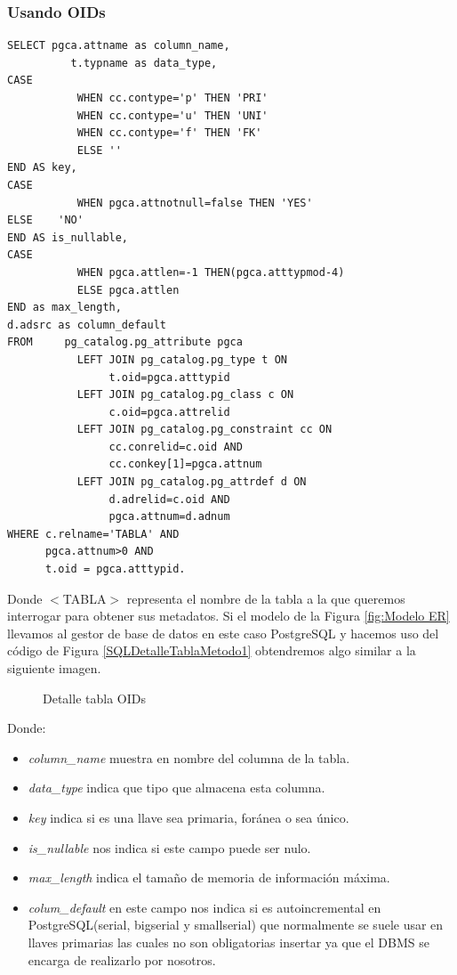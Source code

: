 \subsubsection{Usando OIDs}
\lstset{language=sql,breaklines=true}
\label{SQLDetalleTablaMetodo1}
\begin{lstlisting}
SELECT pgca.attname as column_name,
	      t.typname as data_type,
CASE
		   WHEN cc.contype='p' THEN 'PRI'
		   WHEN cc.contype='u' THEN 'UNI'
		   WHEN cc.contype='f' THEN 'FK'
		   ELSE '' 
END AS key,	
CASE 
		   WHEN pgca.attnotnull=false THEN 'YES' 
ELSE    'NO' 
END AS is_nullable,
CASE 
		   WHEN pgca.attlen=-1 THEN(pgca.atttypmod-4) 
		   ELSE pgca.attlen 
END as max_length,
d.adsrc as column_default
FROM	 pg_catalog.pg_attribute pgca
		   LEFT JOIN pg_catalog.pg_type t ON
			    t.oid=pgca.atttypid
		   LEFT JOIN pg_catalog.pg_class c ON
			    c.oid=pgca.attrelid
		   LEFT JOIN pg_catalog.pg_constraint cc ON 
			    cc.conrelid=c.oid AND 
			    cc.conkey[1]=pgca.attnum
		   LEFT JOIN pg_catalog.pg_attrdef d ON
			    d.adrelid=c.oid AND 
			    pgca.attnum=d.adnum
WHERE c.relname='TABLA' AND
	  pgca.attnum>0 AND
	  t.oid = pgca.atttypid.
\end{lstlisting}
Donde $<$TABLA$>$ representa el nombre de la tabla a la que queremos interrogar para obtener sus metadatos.
Si el modelo de la Figura \ref{fig:Modelo ER} llevamos al gestor de base de datos en este caso PostgreSQL y hacemos uso del c\'odigo de Figura \ref{SQLDetalleTablaMetodo1}  obtendremos algo similar a la siguiente imagen. 
\begin{figure}[H]
\centering
{}
\caption{Detalle tabla OIDs} \label{fig:Detalle Metodo 1}
\end{figure}
Donde:
\begin{itemize}
\item \emph{column\_name} muestra en nombre del columna de la tabla.
\item \emph{data\_type} indica que tipo que almacena esta columna.
\item \emph{key} indica si es una llave sea primaria, for\'anea o sea \'unico.
\item \emph{is\_nullable} nos indica si este campo puede ser nulo.
\item \emph{max\_length} indica el tama\~no de memoria de informaci\'on m\'axima.
\item \emph{colum\_default} en este campo nos indica si es autoincremental en PostgreSQL(serial, bigserial y smallserial) que normalmente se suele usar en llaves primarias las cuales no son obligatorias insertar ya que el DBMS se encarga de realizarlo por nosotros.
\end{itemize}
